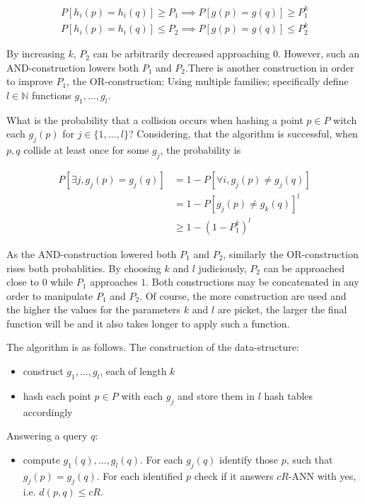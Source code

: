 \begin{align}
    P[h_i(p)=h_i(q)] \geq P_1 \implies P[g(p)=g(q)] \geq P_1^k \\
    P[h_i(p)=h_i(q)] \leq P_2 \implies P[g(p)=g(q)] \leq P_2^k 
\end{align}

By increasing $k$, $P_2$ can be arbitrarily decreased approaching $0$. However, such an AND-construction lowers both $P_1$ and $P_2$.There is another construction in order to improve $P_1$, the OR-construction: Using multiple families; specifically define $l \in \mathbb{N}$ functions $g_1, \dots, g_l$.

What is the probability that a collision occurs when hashing a point $p \in P$ witch each $g_j(p)$ for $j \in \{1, \dots, l\}$? Considering, that the algorithm is successful, when $p,q$ collide at least once for some $g_j$, the probability is

\begin{align}
    P[\exists j, g_j(p)=g_j(q)] &= 1 - P[\forall i, g_j(p) \neq g_j(q)] \\
                                &= 1 - P[g_j(p) \neq g_k(q)]^l \\
                                &\geq 1 - (1-P_1^k)^l
\end{align}

As the AND-construction lowered both $P_1$ and $P_2$, similarly the OR-construction rises both probablities. By choosing $k$ and $l$ judiciously, $P_2$ can be approached close to $0$ while $P_1$ approaches $1$. Both constructions may be concatenated in any order to manipulate $P_1$ and $P_2$. Of course, the more construction are used and the higher the values for the parameters $k$ and $l$ are picket, the larger the final function will be and it also takes longer to apply such a function. 


The algorithm is as follows. The construction of the data-structure:
\begin{itemize}
    \item construct $g_1, \dots, g_l$, each of length $k$
    \item hash each point $p \in P$ with each $g_j$ and store them in $l$ hash tables accordingly
\end{itemize}

Answering a query $q$:
\begin{itemize}
    \item compute $g_1(q), \dots, g_l(q)$. For each $g_j(q)$ identify those $p$, such that $g_j(p) = g_j(q)$. For each identified $p$ check if it answers $cR$-ANN with yes, i.e. $d(p, q) \leq cR$.
\end{itemize}

